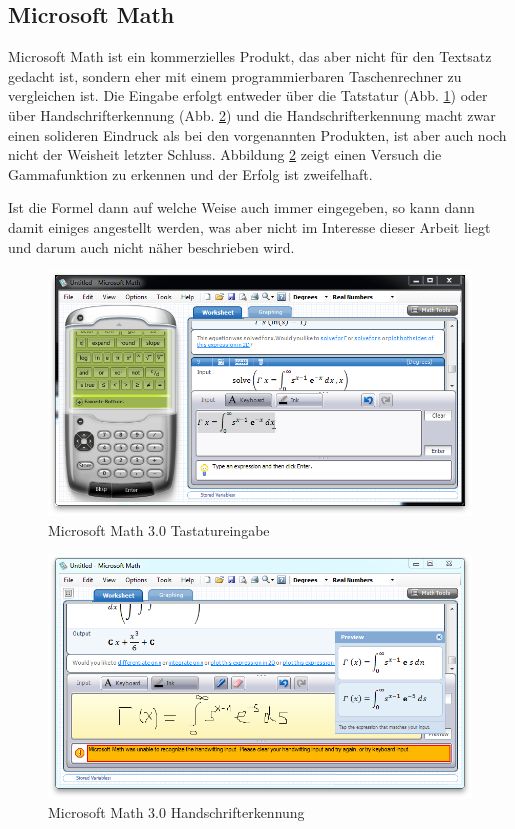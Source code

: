 \subsection{Microsoft Math}

Microsoft Math ist ein kommerzielles Produkt, das aber nicht für den Textsatz gedacht ist, sondern eher mit einem programmierbaren Taschenrechner zu vergleichen ist. Die Eingabe erfolgt entweder über die Tatstatur (Abb. \ref{fig:ms-math-keyboard}) oder über Handschrifterkennung (Abb. \ref{fig:ms-math-ink}) und die Handschrifterkennung macht zwar einen solideren Eindruck als bei den vorgenannten Produkten, ist aber auch noch nicht der Weisheit letzter Schluss. Abbildung \ref{fig:ms-math-ink} zeigt einen Versuch die Gammafunktion zu erkennen und der Erfolg ist zweifelhaft.

Ist die Formel dann auf welche Weise auch immer eingegeben, so kann dann damit einiges angestellt werden, was aber nicht im Interesse dieser Arbeit liegt und darum auch nicht näher beschrieben wird.

\begin{figure}[htbp]
  \begin{center}
    \includegraphics[width=.8\textwidth]{figures/ms-math-keyboard.png}
  \end{center}
  \caption{Microsoft Math 3.0 Tastatureingabe}
  \label{fig:ms-math-keyboard}
\end{figure}

\begin{figure}[htbp]
  \begin{center}
    \includegraphics[width=.8\textwidth]{figures/ms-math-ink.png}
  \end{center}
  \caption{Microsoft Math 3.0 Handschrifterkennung}
  \label{fig:ms-math-ink}
\end{figure}


